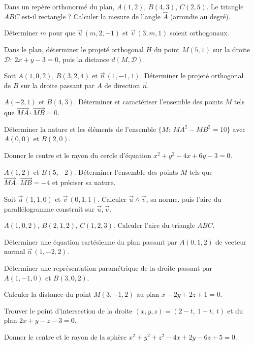 \exo{} Dans un repère orthonormé du plan, $A(1,2)$, $B(4,3)$, $C(2,5)$. Le triangle $ABC$ est-il rectangle ? Calculer la mesure de l'angle $\widehat{A}$ (arrondie au degré).

\exo{} Déterminer $m$ pour que $\vec u\,(m,2,-1)$ et $\vec v\,(3,m,1)$ soient orthogonaux.

\exo{} Dans le plan, déterminer le projeté orthogonal $H$ du point $M(5,1)$ sur la droite $\mathcal D:\ 2x+y-3=0$, puis la distance $d(M,\mathcal D)$.

\exo{} Soit $A(1,0,2)$, $B(3,2,4)$ et $\vec n\,(1,-1,1)$. Déterminer le projeté orthogonal de $B$ sur la droite passant par $A$ de direction $\vec n$.

\exo{} $A(-2,1)$ et $B(4,3)$. Déterminer et caractériser l'ensemble des points $M$ tels que $\overrightarrow{MA}\cdot\overrightarrow{MB}=0$.

\exo{} Déterminer la nature et les éléments de l'ensemble $\{M:\ MA^{2}-MB^{2}=10\}$ avec $A(0,0)$ et $B(2,0)$.

\exo{} Donner le centre et le rayon du cercle d'équation $x^{2}+y^{2}-4x+6y-3=0$.

\exo{} $A(1,2)$ et $B(5,-2)$. Déterminer l'ensemble des points $M$ tels que $\overrightarrow{MA}\cdot\overrightarrow{MB}=-4$ et préciser sa nature.

\exo{} Soit $\vec u\,(1,1,0)$ et $\vec v\,(0,1,1)$. Calculer $\vec u\wedge\vec v$, sa norme, puis l'aire du parallélogramme construit sur $\vec u,\vec v$.

\exo{} $A(1,0,2)$, $B(2,1,2)$, $C(1,2,3)$. Calculer l'aire du triangle $ABC$.

\exo{} Déterminer une équation cartésienne du plan passant par $A(0,1,2)$ de vecteur normal $\vec n\,(1,-2,2)$.

\exo{} Déterminer une représentation paramétrique de la droite passant par $A(1,-1,0)$ et $B(3,0,2)$.

\exo{} Calculer la distance du point $M(3,-1,2)$ au plan $x-2y+2z+1=0$.

\exo{} Trouver le point d'intersection de la droite $(x,y,z)=(2-t,\ 1+t,\ t)$ et du plan $2x+y-z-3=0$.

\exo{} Donner le centre et le rayon de la sphère $x^{2}+y^{2}+z^{2}-4x+2y-6z+5=0$.

